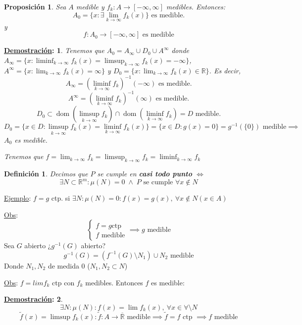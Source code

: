 \documentclass[10pt,a4paper,openright]{book}
\theoremstyle{break}
\newtheorem*{defi}{Definición}
\newtheorem*{prop}{Proposición}
\newtheorem*{demo}{\underline{Demostración}:}
\DeclareMathOperator{\dom}{dom}
\begin{document}
\begin{prop}
Sea $A$ medible y $f_k: A \to \left[-\infty, \infty\right]$ medibles. Entonces: $$A_0 = \{x : \exists \lim_{k \to \infty}f_k\left(x\right)\}\text{ es medible.}$$ 
y 
$$f: A_0 \to \left[-\infty, \infty\right] \text{ es medible}$$
\end{prop}
\begin{demo}
Tenemos que $A_0 = A_{\infty} \cup D_0 \cup A^{\infty}$ donde $A_{\infty} = \{x: \liminf_{k \to \infty}f_k\left(x\right) = \limsup_{k \to \infty}f_k\left(x\right) = -\infty\}$, $A^{\infty} = \{x: \lim_{k \to \infty}f_k\left(x\right) = \infty\}$ y $D_0 = \{x: \lim_{k \to \infty}f_k\left(x\right) \in \mathbb{R}\}$. Es decir,
$$A_{\infty} = \left(\liminf_{k \to \infty}f_k \right)^{-1}\left(-\infty\right) \text{ es medible.}$$
$$A^{\infty} = \left(\liminf_{k \to \infty}f_k \right)^{-1}\left(\infty\right) \text{ es medible.}$$
$$D_0 \subset \dom\left(\limsup_{k \to \infty}f_k\right) \cap \dom\left(\liminf_{k \to \infty}f_k\right) = D \text{ medible.}$$
$$D_0 = \{x \in D: \limsup_{k \to \infty}f_k\left(x\right) = \liminf_{k \to \infty}f_k\left(x\right)\} = \{x \in D: g\left(x\right) = 0\} = g^{-1}\left(\{0\}\right) \text{ medible} \implies$$
$A_0$ es medible.

Tenemos que $f = \lim_{k \to \infty}f_k= \limsup_{k \to \infty}f_k = \liminf_{k \to \infty}f_k$
\end{demo}

\begin{defi}
Decimos que $P$ se cumple en \textbf{casi todo punto} $\iff$
$$\exists N \subset \mathbb{R}^m: \mu\left(N\right) = 0\; \land \;P \text{ se cumple } \forall x \not\in N$$
\end{defi}

\underline{Ejemplo}:
$f = g$ ctp. si $\exists N: \mu\left(N\right) = 0: f\left(x\right) = g\left(x\right),\ \forall x \not\in N \left(x \in A\right)$

\underline{Obs}:
$$\begin{cases}
    f = g \text{ctp}\\
    f \text{ medible}
\end{cases} \implies g \text{ medible}$$
Sea $G$ abierto ¿$g^{-1}\left(G\right)$ abierto?
$$g^{-1}\left(G\right) = \left(f^{-1}\left(G\right) \setminus N_1\right) \cup N_2 \text{ medible}$$
Donde $N_1, N_2$ de medida $0$ ($N_1, N_2 \subset N$)

\underline{Obs}:
$f = lim f_k$  ctp con $f_k$ medibles. Entonces $f$ es medible:
\begin{demo}
$$\exists N: \mu\left(N\right) : f\left(x\right) = \lim f_k\left(x\right),\ \forall x \in \forall \setminus N$$
$$\tilde{f}\left(x\right) = \limsup f_k\left(x\right): \tilde{f}: A \to \overline{\mathbb{R}} \text{ medible} \implies \tilde{f} = f \text{ ctp } \implies f \text{ medible}$$
\end{demo}
\end{document}
